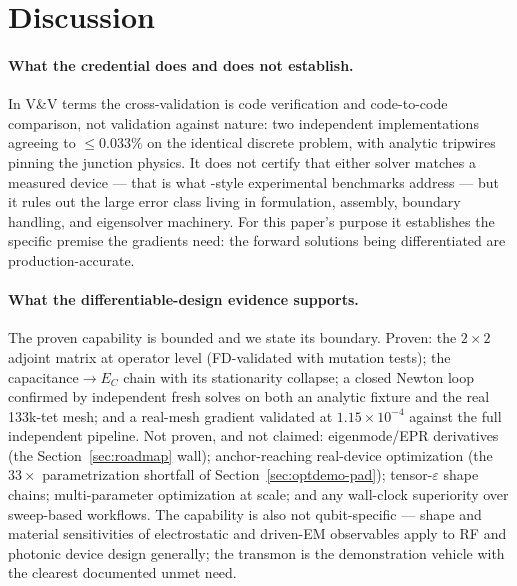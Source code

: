 \documentclass{anvil-paper}
\begin{document}
\section{Discussion}
\label{sec:discussion}

\paragraph{What the credential does and does not establish.}
In V\&V terms \citep{roache1997quantification,oberkampf2010verification}
the cross-validation is code verification and code-to-code comparison,
not validation against nature: two independent implementations agreeing
to $\leq 0.033\%$ on the identical discrete problem, with analytic
tripwires pinning the junction physics. It does not certify that either
solver matches a measured device --- that is what
\citet{ye2025electromagnetic}-style experimental benchmarks address ---
but it rules out the large error class living in formulation, assembly,
boundary handling, and eigensolver machinery. For this paper's purpose
it establishes the specific premise the gradients need: the forward
solutions being differentiated are production-accurate.

\paragraph{What the differentiable-design evidence supports.}
The proven capability is bounded and we state its boundary. Proven: the
$2\times 2$ adjoint matrix at operator level (FD-validated with mutation
tests); the capacitance$\to E_C$ chain with its stationarity collapse;
a closed Newton loop confirmed by independent fresh solves on both an
analytic fixture and the real 133k-tet mesh; and a real-mesh gradient
validated at $1.15\times10^{-4}$ against the full independent pipeline.
Not proven, and not claimed: eigenmode/EPR derivatives (the
Section~\ref{sec:roadmap} wall); anchor-reaching real-device
optimization (the $33\times$ parametrization shortfall of
Section~\ref{sec:optdemo-pad}); tensor-$\varepsilon$ shape chains;
multi-parameter optimization at scale; and any wall-clock superiority
over sweep-based workflows. The capability is also not qubit-specific
--- shape and material sensitivities of electrostatic and driven-EM
observables apply to RF and photonic device design generally; the
transmon is the demonstration vehicle with the clearest documented
unmet need.
\end{document}
